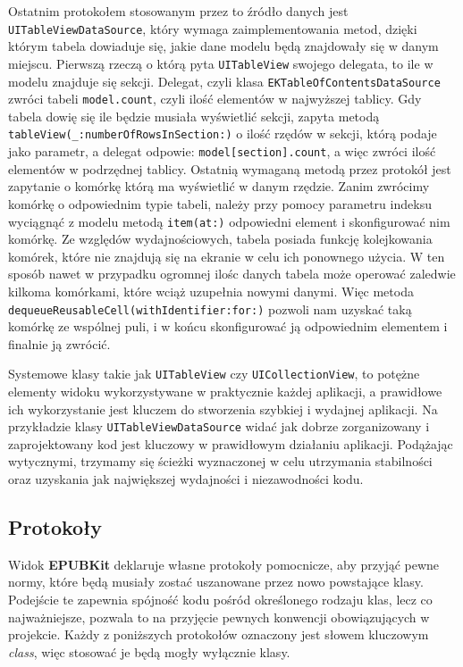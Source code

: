 Ostatnim protokołem stosowanym przez to źródło danych jest \texttt{UITableViewDataSource}, który wymaga zaimplementowania metod, dzięki którym tabela dowiaduje się, jakie dane modelu będą znajdowały się w danym miejscu. Pierwszą rzeczą o którą pyta \texttt{UITableView} swojego delegata, to ile w modelu znajduje się sekcji. Delegat, czyli klasa \texttt{EKTableOfContentsDataSource} zwróci tabeli \texttt{model.count}, czyli ilość elementów w najwyższej tablicy. Gdy tabela dowię się ile będzie musiała wyświetlić sekcji, zapyta metodą \texttt{tableView(\_:numberOfRowsInSection:)} o ilość rzędów w sekcji, którą podaje jako parametr, a delegat odpowie: \texttt{model[section].count}, a więc zwróci ilość elementów w podrzędnej tablicy. Ostatnią wymaganą metodą przez protokół jest zapytanie o komórkę którą ma wyświetlić w danym rzędzie. Zanim zwrócimy komórkę o odpowiednim typie tabeli, należy przy pomocy parametru indeksu wyciągnąć z modelu metodą \texttt{item(at:)} odpowiedni element i skonfigurować nim komórkę. Ze względów wydajnościowych, tabela posiada funkcję kolejkowania komórek, które nie znajdują się na ekranie w celu ich ponownego użycia. W ten sposób nawet w przypadku ogromnej ilośc danych tabela może operować zaledwie kilkoma komórkami, które wciąż uzupełnia nowymi danymi. Więc metoda \texttt{dequeueReusableCell(withIdentifier:for:)} pozwoli nam uzyskać taką komórkę ze wspólnej puli, i w końcu skonfigurować ją odpowiednim elementem i finalnie ją zwrócić.

Systemowe klasy takie jak \texttt{UITableView} czy \texttt{UICollectionView}, to potężne elementy widoku wykorzystywane w praktycznie każdej aplikacji, a prawidłowe ich wykorzystanie jest kluczem do stworzenia szybkiej i wydajnej aplikacji. Na przykładzie klasy \texttt{UITableViewDataSource} widać jak dobrze zorganizowany i zaprojektowany kod jest kluczowy w prawidłowym działaniu aplikacji. Podążając wytycznymi, trzymamy się ścieżki wyznaczonej w celu utrzymania stabilności oraz uzyskania jak największej wydajności i niezawodności kodu.

\subsection{Protokoły}

Widok \textbf{EPUBKit} deklaruje własne protokoły pomocnicze, aby przyjąć pewne normy, które będą musiały zostać uszanowane przez nowo powstające klasy. Podejście te zapewnia spójność kodu pośród określonego rodzaju klas, lecz co najważniejsze, pozwala to na przyjęcie pewnych konwencji obowiązujących w projekcie. Każdy z poniższych protokołów oznaczony jest słowem kluczowym \textit{class}, więc stosować je będą mogły wyłącznie klasy.

